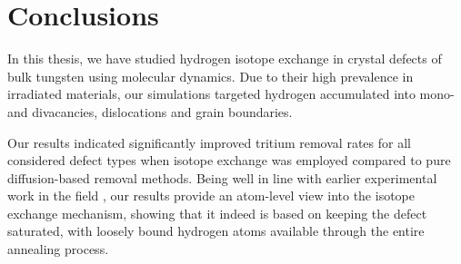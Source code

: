 \chapter{Conclusions}

In this thesis, we have studied hydrogen isotope exchange in crystal defects of bulk tungsten using molecular dynamics. 
Due to their high prevalence in irradiated materials, our simulations targeted hydrogen accumulated into mono- and divacancies, dislocations and grain boundaries.  

Our results indicated significantly improved tritium removal rates for all considered defect types when isotope exchange was employed compared to pure diffusion-based removal methods.
Being well in line with earlier experimental work in the field \cite{ahlgren2019hydrogen}, our results provide an atom-level view into the isotope exchange mechanism, showing that it indeed is based on keeping the defect saturated, with loosely bound hydrogen atoms available through the entire annealing process.